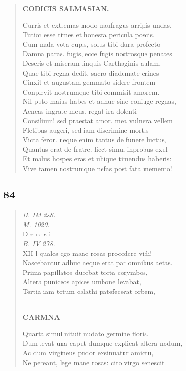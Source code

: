 \documentclass[11pt, a4paper]{report}
\begin{document}
\begin{verse}
    \begin{center} \textbf{CODICIS SALMASIAN.} \end{center} \marginpar{[119]} Curris et extremas modo naufragus arripis undas. \\ Tutior esse times et honesta pericula poscis. \\ Cum mala vota cupis, solus tibi dura profecto \\ Damna paras. fugis, ecce fugis nostrosque penates \\ Deseris et miseram linquis Carthaginis aulam, \\ Quae tibi regna dedit, sacro diademate crines \\ Cinxit et augustam gemmato sidere frontem \\ Conplevit nostrumque tibi commisit amorem. \\ Nil puto maius habes et adhuc sine coniuge regnas, \\ Aeneas ingrate meus. regat ira dolenti \\ Consilium! sed praestat amor. mea vulnera vellem \\ Fletibus augeri, sed iam discrimine mortis \\ Victa feror. neque enim tantus de funere luctus, \\ Quantus erat de fratre. licet simul inprobus exul \\ Et malus hospes eras et ubique timendus haberis: \\ Vive tamen nostrumque nefas post fata memento! \\ 
      \end{verse}
  
            \subsection*{84}
      \begin{verse}
      \textit{B. IM 2s8.} \\ \textit{M. 1020.} \\ D e ro s i \\ \textit{B. IV 278.} \\ XII  \lbrack l quales ego mane rosas procedere vidi! \\ Nascebantur adhuc neque erat par omnibus aetas. \\ Prima papillatos ducebat  \lbrack tecta \rbrack  corymbos, \\ Altera puniceos apices umbone levabat, \\ Tertia iam totum calathi patefecerat orbem, \\ 
        ﻿\pagebreak 
     \marginpar{[120]} \begin{center} \textbf{CARMNA} \end{center}Quarta simul nituit nudato germine floris. \\ Dum levat una caput dumque explicat altera nodum, \\ Ac dum virgineus pudor exsinuatur amictu, \\ Ne pereant, lege mane rosas:  \lbrack cito \rbrack  virgo senescit. \\ 
      \end{verse}
  
\end{document}
